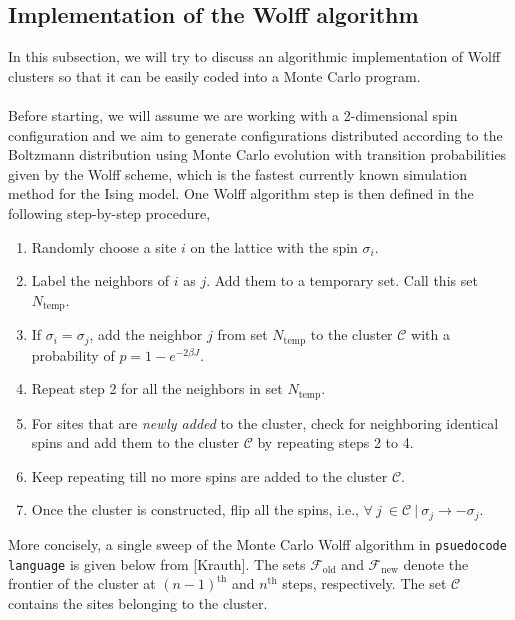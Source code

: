 \documentclass[../journal_main.tex]{subfiles}
\begin{document}
\subsection{Implementation of the Wolff algorithm}
In this subsection, we will try to discuss an algorithmic implementation of Wolff clusters so that it can be easily coded into a Monte Carlo program.~\\~\\
Before starting, we will assume we are working with a 2-dimensional spin configuration and we aim to generate configurations distributed according to the Boltzmann distribution using Monte Carlo evolution with transition probabilities given by the Wolff scheme, which is the fastest currently known simulation method for the Ising model. One Wolff algorithm step is then defined in the following step-by-step procedure,
\begin{enumerate}
    \setlength\itemsep{0.3em}
    \item Randomly choose a site $i$ on the lattice with the spin $\sigma_i$.
    \item Label the neighbors of $i$ as $j$. Add them to a temporary set. Call this set $N_\text{temp}$. 
    \item If $\sigma_i = \sigma_j$, add the neighbor $j$ from set $N_\text{temp}$ to the cluster $\mathcal{C}$  with a probability of $p = 1 - e^{-2\beta J}$.
    \item Repeat step 2 for all the neighbors in set $N_\text{temp}$.
    \item For sites that are \textit{newly added} to the cluster, check for neighboring identical spins and add them to the cluster $\mathcal{C}$ by repeating steps 2 to 4.
    \item Keep repeating till no more spins are added to the cluster $\mathcal{C}$.
    \item Once the cluster is constructed, flip all the spins, i.e., $\forall \:j \: \in \mathcal{C} \: | \: \sigma_j \to - \sigma_j$.
\end{enumerate}
More concisely, a single sweep of the Monte Carlo Wolff algorithm in \texttt{psuedocode language} is given below from [Krauth]. The sets $\mathcal{F}_\text{old}$ and $\mathcal{F}_\text{new}$ denote the frontier of the cluster at $(n-1)^\text{th}$ and $n^\text{th}$ steps, respectively. The set $\mathcal{C}$ contains the sites belonging to the cluster.~\\~\\
\end{document}
